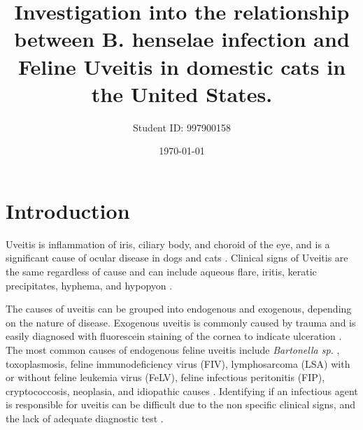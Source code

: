 \documentclass[11pt,twocolumn]{article}
\title{Investigation into the relationship between B. henselae infection and Feline Uveitis in domestic cats in the United States.}
\author{Student ID: 997900158}
\date{\today}
\begin{document}

	\section{Introduction}
		Uveitis is inflammation of iris, ciliary body, and choroid of the eye, and is a significant cause of ocular disease in dogs and cats \cite{Townsend2008}. 
		Clinical signs of Uveitis are the same regardless of cause and can include aqueous flare, iritis, keratic precipitates, hyphema, and hypopyon \cite{Powell2010}.


		The causes of uveitis can be grouped into endogenous and exogenous, depending on the nature of disease. Exogenous uveitis is commonly caused by trauma and is easily diagnosed with fluorescein staining of the cornea to indicate ulceration \cite{Fontenelle2008}.
		The most common causes of endogenous feline uveitis include \emph{Bartonella sp.} , toxoplasmosis, feline immunodeficiency virus (FIV), lymphosarcoma (LSA) with or without feline leukemia virus (FeLV), feline infectious peritonitis (FIP), cryptococcosis, neoplasia, and idiopathic causes \cite{Powell2001}.
		Identifying if an infectious agent is responsible for uveitis can be difficult due to the non specific clinical signs, and the lack of adequate diagnostic test \cite{Fontenelle2008}.
\end{document}
